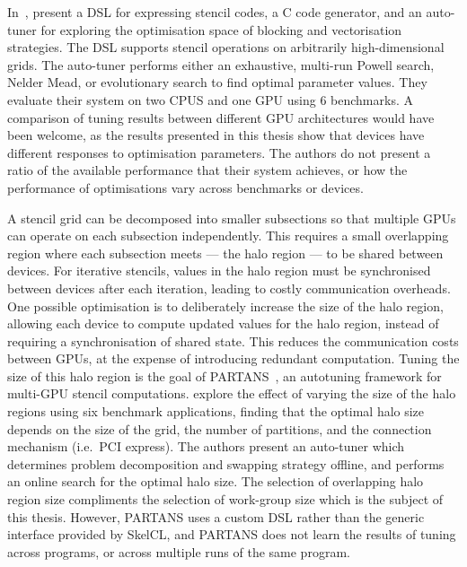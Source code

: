 In~\cite{Christen2011}, \citeauthor{Christen2011} present a DSL for
expressing stencil codes, a C code generator, and an auto-tuner for
exploring the optimisation space of blocking and vectorisation
strategies. The DSL supports stencil operations on arbitrarily
high-dimensional grids. The auto-tuner performs either an exhaustive,
multi-run Powell search, Nelder Mead, or evolutionary search to find
optimal parameter values. They evaluate their system on two CPUS and
one GPU using 6 benchmarks. A comparison of tuning results between
different GPU architectures would have been welcome, as the results
presented in this thesis show that devices have different responses to
optimisation parameters. The authors do not present a ratio of the
available performance that their system achieves, or how the
performance of optimisations vary across benchmarks or devices.

A stencil grid can be decomposed into smaller subsections so that
multiple GPUs can operate on each subsection independently. This
requires a small overlapping region where each subsection meets ---
the halo region --- to be shared between devices. For iterative
stencils, values in the halo region must be synchronised between
devices after each iteration, leading to costly communication
overheads. One possible optimisation is to deliberately increase the
size of the halo region, allowing each device to compute updated
values for the halo region, instead of requiring a synchronisation of
shared state. This reduces the communication costs between GPUs, at
the expense of introducing redundant computation. Tuning the size of
this halo region is the goal of PARTANS~\cite{Lutz2013}, an autotuning
framework for multi-GPU stencil computations. \citeauthor{Lutz2013}
explore the effect of varying the size of the halo regions using six
benchmark applications, finding that the optimal halo size depends on
the size of the grid, the number of partitions, and the connection
mechanism (i.e.\ PCI express). The authors present an auto-tuner which
determines problem decomposition and swapping strategy offline, and
performs an online search for the optimal halo size. The selection of
overlapping halo region size compliments the selection of work-group
size which is the subject of this thesis. However, PARTANS uses a
custom DSL rather than the generic interface provided by SkelCL, and
PARTANS does not learn the results of tuning across programs, or
across multiple runs of the same program.



